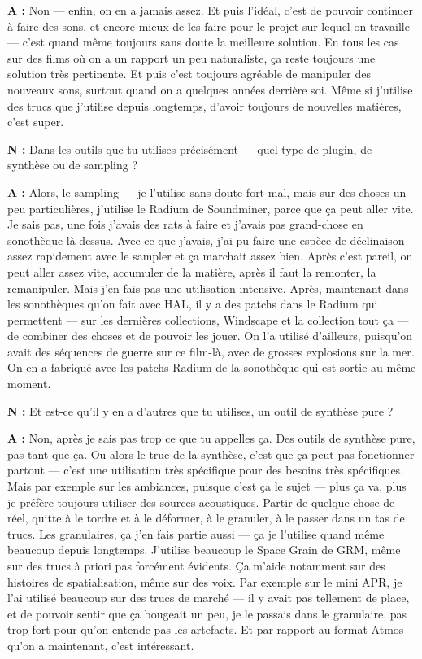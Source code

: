 ﻿\documentclass[12pt]{article}
\begin{document}
\textbf{A :} Non — enfin, on en a jamais assez. Et puis l'idéal, c'est de pouvoir continuer à faire des sons, et encore mieux de les faire pour le projet sur lequel on travaille — c'est quand même toujours sans doute la meilleure solution. En tous les cas sur des films où on a un rapport un peu naturaliste, ça reste toujours une solution très pertinente. Et puis c'est toujours agréable de manipuler des nouveaux sons, surtout quand on a quelques années derrière soi. Même si j'utilise des trucs que j'utilise depuis longtemps, d'avoir toujours de nouvelles matières, c'est super. 

\textbf{N :} Dans les outils que tu utilises précisément — quel type de plugin, de synthèse ou de sampling ? 

\textbf{A :} Alors, le sampling — je l'utilise sans doute fort mal, mais sur des choses un peu particulières, j'utilise le Radium de Soundminer, parce que ça peut aller vite. Je sais pas, une fois j'avais des rats à faire et j'avais pas grand-chose en sonothèque là-dessus. Avec ce que j'avais, j'ai pu faire une espèce de déclinaison assez rapidement avec le sampler et ça marchait assez bien. Après c'est pareil, on peut aller assez vite, accumuler de la matière, après il faut la remonter, la remanipuler. Mais j'en fais pas une utilisation intensive. Après, maintenant dans les sonothèques qu'on fait avec HAL, il y a des patchs dans le Radium qui permettent — sur les dernières collections, Windscape et la collection tout ça — de combiner des choses et de pouvoir les jouer. On l'a utilisé d'ailleurs, puisqu'on avait des séquences de guerre sur ce film-là, avec de grosses explosions sur la mer. On en a fabriqué avec les patchs Radium de la sonothèque qui est sortie au même moment. 

\textbf{N :} Et est-ce qu'il y en a d'autres que tu utilises, un outil de synthèse pure ? 

\textbf{A :} Non, après je sais pas trop ce que tu appelles ça. Des outils de synthèse pure, pas tant que ça. Ou alors le truc de la synthèse, c'est que ça peut pas fonctionner partout — c'est une utilisation très spécifique pour des besoins très spécifiques. Mais par exemple sur les ambiances, puisque c'est ça le sujet — plus ça va, plus je préfère toujours utiliser des sources acoustiques. Partir de quelque chose de réel, quitte à le tordre et à le déformer, à le granuler, à le passer dans un tas de trucs. Les granulaires, ça j'en fais partie aussi — ça je l'utilise quand même beaucoup depuis longtemps. J'utilise beaucoup le Space Grain de GRM, même sur des trucs à priori pas forcément évidents. Ça m'aide notamment sur des histoires de spatialisation, même sur des voix. Par exemple sur le mini APR, je l'ai utilisé beaucoup sur des trucs de marché — il y avait pas tellement de place, et de pouvoir sentir que ça bougeait un peu, je le passais dans le granulaire, pas trop fort pour qu'on entende pas les artefacts. Et par rapport au format Atmos qu'on a maintenant, c'est intéressant. 
\end{document}
